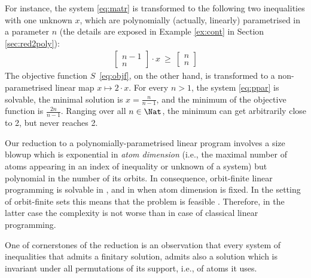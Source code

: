 \begin{slexample} %
\label{ex:poly}
For instance, the system \eqref{eq:matr} %
is transformed to the following two inequalities with one unknown $x$,
which are polynomially (actually, linearly) parametrised in a parameter $n$ (the details are exposed in Example \ref{ex:cont} in Section \ref{sec:red2poly}): 
\begin{align} \label{eq:ppar}
\begin{bmatrix}
n-1 \\
n
\end{bmatrix}
\cdot
x
\ \geq \ 
\begin{bmatrix}
n \\
n
\end{bmatrix}
\end{align}
%
The objective function $S$~\eqref{eq:objf}, on the other hand, is transformed to a 
non-parametrised linear map $x\mapsto 2\cdot x$.
For every $n > 1$, the system \eqref{eq:ppar} is solvable,
the minimal solution is $x=\frac{n}{n-1}$, and
the minimum of the objective function is $\frac{2n}{n-1}$.
Ranging over all $n\in\Nat$, the minimum can get arbitrarily close to 2, but never reaches 2.
\end{slexample}

Our reduction to a polynomially-parametrised linear program involves a size blowup
which is exponential in \emph{atom dimension}
(i.e., the maximal number of atoms appearing in an index of inequality or unknown of a system)
but polynomial in the number of its orbits.
In consequence, orbit-finite linear programming is solvable in \EXPTIME, and in \PTIME when
atom dimension is fixed.
In the setting of orbit-finite sets this means that the problem is feasible \cite{BT18}.
Therefore, in the latter case the complexity is not worse than in case of
classical linear programming.


\smallskip

One of cornerstones of the reduction is an observation that every system of inequalities that admits
a finitary solution, 
admits also a solution which is invariant under all permutations of its support, i.e., of atoms it uses.

